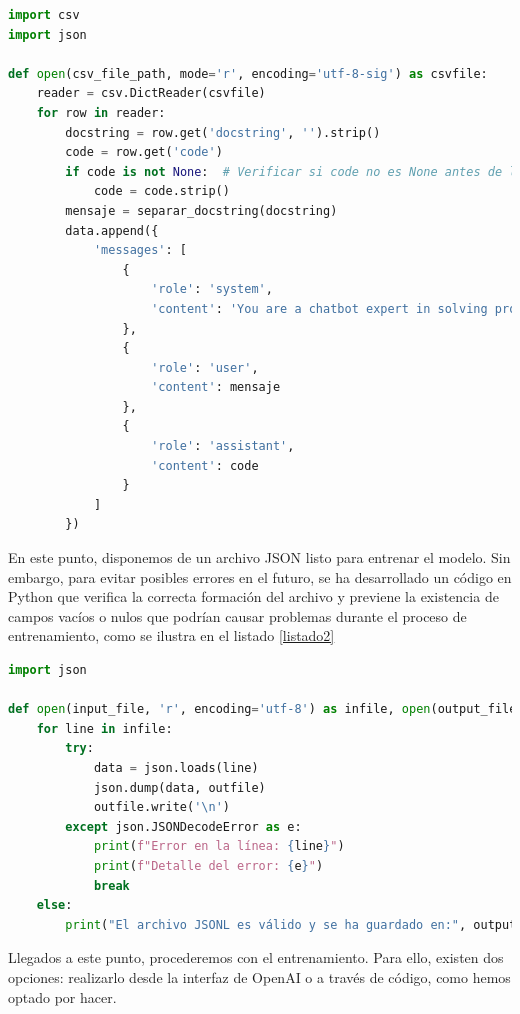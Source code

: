 \begin{lstlisting}[language=Python, caption={Conversión CSV a JSON.}, label=listado1]
import csv
import json
    
def open(csv_file_path, mode='r', encoding='utf-8-sig') as csvfile:
    reader = csv.DictReader(csvfile)
    for row in reader:
        docstring = row.get('docstring', '').strip()
        code = row.get('code')
        if code is not None:  # Verificar si code no es None antes de llamar a strip()
            code = code.strip()
        mensaje = separar_docstring(docstring)
        data.append({
            'messages': [
                {
                    'role': 'system',
                    'content': 'You are a chatbot expert in solving programming problems in Python.'
                },
                {
                    'role': 'user',
                    'content': mensaje
                },
                {
                    'role': 'assistant',
                    'content': code
                }
            ]
        })
\end{lstlisting}

\bigskip %
En este punto, disponemos de un archivo \acrshort{JSON} listo para entrenar el modelo. Sin embargo, para evitar posibles errores en el futuro, se ha desarrollado un código en Python que verifica la correcta formación del archivo y previene la existencia de campos vacíos o nulos que podrían causar problemas durante el proceso de entrenamiento, como se ilustra en el listado \ref{listado2} 
\bigskip %

\begin{lstlisting}[language=Python, caption={Validación archivo JSON.}, label=listado2]
import json

def open(input_file, 'r', encoding='utf-8') as infile, open(output_file, 'w', encoding='utf-8') as outfile:
    for line in infile:
        try:
            data = json.loads(line)
            json.dump(data, outfile)
            outfile.write('\n')
        except json.JSONDecodeError as e:
            print(f"Error en la línea: {line}")
            print(f"Detalle del error: {e}")
            break
    else:
        print("El archivo JSONL es válido y se ha guardado en:", output_file)

\end{lstlisting}

\bigskip %
Llegados a este punto, procederemos con el entrenamiento. Para ello, existen dos opciones: realizarlo desde la interfaz de OpenAI o a través de código, como hemos optado por hacer.

